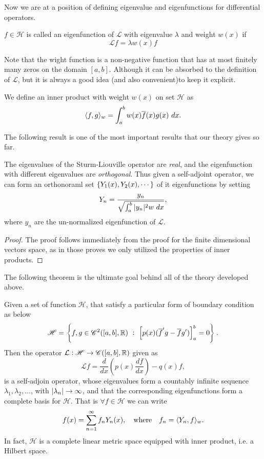 Now we are at a position of defining eigenvalue and eigenfunctions for differential operators.

\begin{definition}
	$f \in \mathscr{H}$ is called an eigenfunction of $\mathcal{L}$ with eigenvalue $\lambda$ and weight $w(x)$ if 
	\[ \mathcal{L}f = \lambda w(x) f \]
\end{definition}
\begin{remark}
	Note that the wight function is a non-negative function that has at most finitely many zeros on the domain $[a,b]$. Although it can be absorbed to the definition of $\mathcal{L}$, but it is always a good idea (and also convenient)to keep it explicit. 
\end{remark}
\begin{definition}
	We define an inner product with weight $w(x)$ on set $\mathscr{H}$ as 
	\[ \langle f, g \rangle_w = \int_{a}^{b}w(x)\overline{f}(x)g(x)\ dx. \]
\end{definition}
The following result is one of the most important results that our theory gives so far.
\begin{proposition}
	The eigenvalues of the Sturm-Liouville operator are \emph{real}, and the eigenfunction with different eigenvalues are \emph{orthogonal}. Thus given a self-adjoint operator, we can form an orthonoraml set $\{Y_1(x),Y_2(x),\cdots\}$ of it eigenfunctions by setting
	\[ Y_n = \frac{y_n}{\sqrt{\int_{a}^{b}|y_n|^2w\ dx}}, \]
	where $y_n$ are the un-normalized eigenfunction of $\mathcal{L}$.
\end{proposition}
\begin{proof}
	The proof follows immediately from the proof for the finite dimensional vectors space, as in those proves we only utilized the properties of inner products.
\end{proof}
The following theorem is the ultimate goal behind all of the theory developed above.
\begin{theorem}
	Given a set of function $\mathcal{H}$, that satisfy a particular form of boundary condition as below
	\[ \mathscr{H} = \left\{ f,g \in \mathscr{C}^2([a,b],\mathbb{R})\ :\ \left[ p(x)(\overline{f}'g - \overline{f}g') \right]_a^b = 0 \right\}. \]
	Then the operator $\mathcal{L}: \mathscr{H} \to \mathscr{C}([a,b],\mathbb{R})$ given as
	\[  \mathcal{L} f = \frac{d}{dx}(p(x)\frac{df}{dx}) - q(x)f, \]
	is a self-adjoin operator, whose eigenvalues form a countably infinite sequence $\lambda_1, \lambda_2, \dots$, with $|\lambda_n| \to \infty$, and that the corresponding eigenfunctions form a complete basis for $\mathcal{H}$. That is $\forall f \in \mathscr{H}$ we can write
	\[ f(x) = \sum_{n=1}^{\infty}f_n Y_n(x), \quad \text{where} \quad f_n = \langle Y_n, f \rangle_w. \]
	In fact, $\mathscr{H}$ is a complete linear metric space equipped with inner product, i.e. a Hilbert space. 
\end{theorem}

